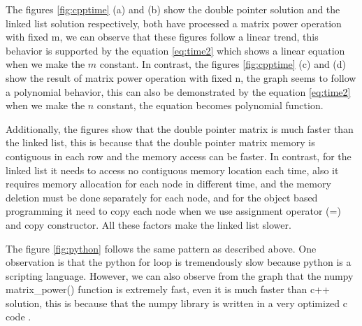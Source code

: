 \documentclass[12pt]{article}
\begin{document}
    The figures \ref{fig:cpptime} (a) and (b) show the double pointer solution and the linked list solution respectively, both have processed a matrix power operation with fixed m, we can observe that these figures follow a linear trend, this behavior is supported by the equation \ref{eq:time2} which shows a linear equation when we make the $m$ constant.
    In contrast, the figures \ref{fig:cpptime} (c) and (d) show the result of matrix power operation with fixed n, the graph seems to follow a polynomial behavior, this can also be demonstrated by the equation \ref{eq:time2} when we make the $n$ constant, the equation becomes polynomial function.


Additionally, the figures show that the double pointer matrix is much faster than the linked list, this is because that the double pointer matrix memory is contiguous in each row and the memory access can be faster. In contrast, for the linked list it needs to access  no contiguous memory location each time, also it requires memory allocation for each node in different time, and the memory deletion must be done separately for each node, and for the object based programming it need to copy each node when we use assignment operator (=) and copy constructor. All these factors make the linked list slower.


The figure \ref{fig:python} follows the same pattern as described above. One observation is that the python for loop is tremendously slow because python is a scripting language. However, we can also observe from the graph that the numpy matrix\_power() function is extremely fast, even it is much faster than c++ solution, this is because that the numpy library is written in a very optimized c code \cite{numpy}.
\end{document}
